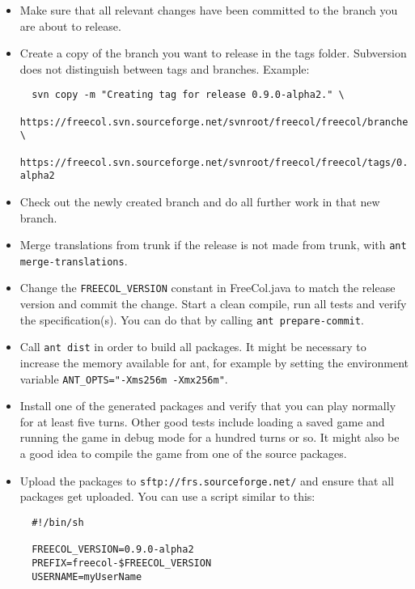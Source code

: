 \documentclass[12pt]{book}
\begin{document}
\begin{itemize}

\item Make sure that all relevant changes have been committed to the
  branch you are about to release.

\item Create a copy of the branch you want to release in the tags
  folder. Subversion does not distinguish between tags and
  branches. Example:

{\small
\begin{verbatim}
  svn copy -m "Creating tag for release 0.9.0-alpha2." \
  https://freecol.svn.sourceforge.net/svnroot/freecol/freecol/branches/0.9.x \
  https://freecol.svn.sourceforge.net/svnroot/freecol/freecol/tags/0.9.0-alpha2
\end{verbatim}
}

\item Check out the newly created branch and do all further work in that
  new branch.

\item Merge translations from trunk if the release is not made from
  trunk, with \verb+ant merge-translations+.

\item Change the \verb$FREECOL_VERSION$ constant in FreeCol.java to
  match the release version and commit the change. Start a clean
  compile, run all tests and verify the specification(s). You can do
  that by calling \verb+ant prepare-commit+.

\item Call \verb+ant dist+ in order to build all packages. It might be
  necessary to increase the memory available for ant, for example by
  setting the environment variable \verb+ANT_OPTS="-Xms256m -Xmx256m"+.

\item Install one of the generated packages and verify that you can play
  normally for at least five turns. Other good tests include loading a
  saved game and running the game in debug mode for a hundred turns or
  so. It might also be a good idea to compile the game from one of the
  source packages.

\item Upload the packages to \verb$sftp://frs.sourceforge.net/$ and ensure that
  all packages get uploaded. You can use a script similar to this:

\begin{verbatim}
  #!/bin/sh

  FREECOL_VERSION=0.9.0-alpha2
  PREFIX=freecol-$FREECOL_VERSION
  USERNAME=myUserName


\end{verbatim}
\end{itemize}
\end{document}
